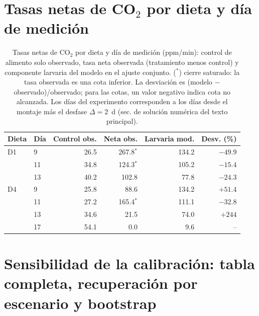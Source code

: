 \documentclass[11pt,a4paper]{article}
\begin{document}
\section{Tasas netas de CO$_2$ por dieta y día de medición}
\label{sec:tasasdia}

\begin{table}[htbp]
\centering
\small
\caption{Tasas netas de CO$_2$ por dieta y día de medición (ppm/min): control de alimento solo observado, tasa neta observada (tratamiento menos control) y componente larvaria del modelo en el ajuste conjunto. ($^{*}$) cierre saturado: la tasa observada es una cota inferior. La desviación es (modelo $-$ observado)/observado; para las cotas, un valor negativo indica cota no alcanzada. Los días del experimento corresponden a los días desde el montaje más el desfase $\Delta = 2$~d (sec. de solución numérica del texto principal).}
\label{tab:tasas}
\begin{tabular}{ll rrr r}
\toprule
Dieta & Día & Control obs. & Neta obs. & Larvaria mod. & Desv. (\%) \\
\midrule
D1 & 9  & 26.5 & 267.8$^{*}$ & 134.2 & $-49.9$ \\
   & 11 & 34.8 & 124.3$^{*}$ & 105.2 & $-15.4$ \\
   & 13 & 40.2 & 102.8        & 77.8  & $-24.3$ \\
\midrule
D4 & 9  & 25.8 & 88.6         & 134.2 & $+51.4$ \\
   & 11 & 27.2 & 165.4$^{*}$ & 111.1 & $-32.8$ \\
   & 13 & 34.6 & 21.5         & 74.0  & $+244$ \\
   & 17 & 54.1 & 0.0          & 9.6   & -- \\
\bottomrule
\end{tabular}
\end{table}

\section{Sensibilidad de la calibración: tabla completa, recuperación por escenario y bootstrap}
\label{sec:senstab}
\end{document}

